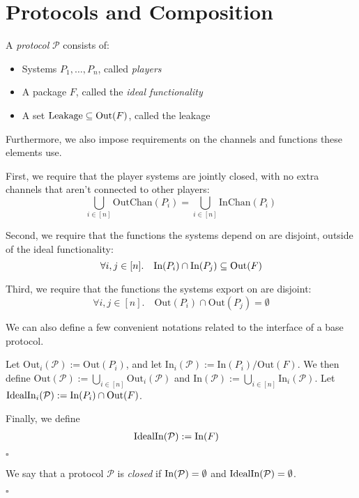 \section{Protocols and Composition}

\begin{definition}[Protocols]
A \emph{protocol} $\mathcal{P}$ consists of:
\begin{itemize}
\item Systems $P_1, \ldots, P_n$, called \emph{players}
\item A package $F$, called the \emph{ideal functionality}
\item A set $\text{Leakage} \subseteq \text{Out}(F)$, called the leakage
\end{itemize}

Furthermore, we also impose requirements on the channels and functions
these elements use.

First, we require that the player systems are jointly closed,
with no extra channels that aren't connected to other players:
$$
\bigcup_{i \in [n]} \text{OutChan}(P_i) = \bigcup_{i \in [n]} \text{InChan}(P_i)
$$

Second, we require that the functions the systems depend on are disjoint,
outside of the ideal functionality:
$$
\forall i, j \in [n].\quad \text{In}(P_i) \cap \text{In}(P_j) \subseteq \text{Out}(F)
$$

Third, we require that the functions the systems export on are disjoint:
$$
\forall i, j \in [n].\quad \text{Out}(P_i) \cap \text{Out}(P_j) = \emptyset
$$

We can also define a few convenient notations related to the interface of a base
protocol.

Let $\text{Out}_i(\mathcal{P}) := \text{Out}(P_i)$, and let $\text{In}_i(\mathcal{P}) := \text{In}(P_i) / \text{Out}(F)$.
We then define $\text{Out}(\mathcal{P}) := \bigcup_{i \in [n]} \text{Out}_i(\mathcal{P})$
and $\text{In}(\mathcal{P}) := \bigcup_{i \in [n]} \text{In}_i(\mathcal{P})$.
Let $\text{IdealIn}_i(\mathcal{P}) := \text{In}(P_i) \cap \text{Out}(F)$.

Finally, we define
$$
\begin{aligned}
&\text{IdealIn}(\mathcal{P}) := \text{In}(F)\cr
\end{aligned}
$$

$\square$
\end{definition}

\begin{definition}
  We say that a protocol $\mathcal{P}$ is \emph{closed} if
  $\text{In}(\mathcal{P}) = \emptyset$ and $\text{IdealIn}(\mathcal{P}) = \emptyset$.

  $\square$
\end{definition}

